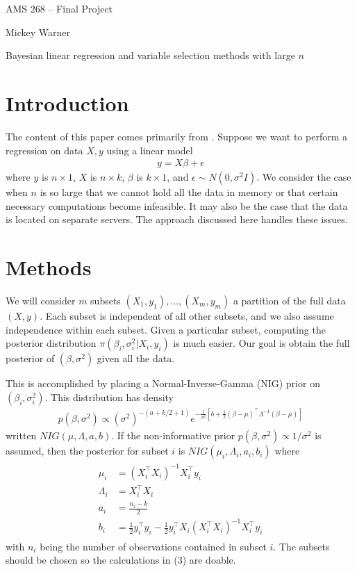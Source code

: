 \documentclass[12pt]{article}
\begin{document}
\noindent AMS 268 -- Final Project

\noindent Mickey Warner
\bigskip
\bigskip

{\Large \noindent Bayesian linear regression and variable selection methods with large $n$}


\section{Introduction}

The content of this paper comes primarily from \cite{qian2017big}. Suppose we want to perform a regression on data $X,y$ using a linear model
\begin{align}
y = X \beta + \epsilon
\end{align}
where $y$ is $n\times 1$, $X$ is $n\times k$, $\beta$ is $k\times 1$, and $\epsilon\sim N(0, \sigma^2 I)$. We consider the case when $n$ is so large that we cannot hold all the data in memory or that certain necessary computations become infeasible. It may also be the case that the data is located on separate servers. The approach discussed here handles these issues.

\section{Methods}

We will consider $m$ subsets $(X_1,y_1),\ldots,(X_m,y_m)$ a partition of the full data $(X,y)$. Each subset is independent of all other subsets, and we also assume independence within each subset. Given a particular subset, computing the posterior distribution $\pi(\beta_i,\sigma_i^2|X_i, y_i)$ is much easier. Our goal is obtain the full posterior of $(\beta,\sigma^2)$ given all the data.

This is accomplished by placing a Normal-Inverse-Gamma (NIG) prior on $(\beta_i,\sigma_i^2)$. This distribution has density
\begin{align}
p(\beta, \sigma^2) \propto (\sigma^2)^{-(a+k/2+1)}e^{-\frac{1}{\sigma^2}\left[b+\frac{1}{2}(\beta-\mu)^\top \Lambda^{-1}(\beta-\mu)\right]}
\end{align}
written $NIG(\mu,\Lambda,a,b)$. If the non-informative prior $p(\beta,\sigma^2)\propto 1/\sigma^2$ is assumed, then the posterior for subset $i$ is $NIG(\mu_i,\Lambda_i,a_i,b_i)$ where
\begin{align}
\begin{split}
\mu_i &= (X_i^\top X_i)^{-1} X_i^\top y_i \\
\Lambda_i &= X_i^\top X_i \\
a_i &= \frac{n_i-k}{2} \\
b_i &= \frac{1}{2}y_i^\top y_i -\frac{1}{2}y_i^\top X_i (X_i^\top X_i)^{-1} X_i^\top y_i
\end{split}
\end{align}
with $n_i$ being the number of observations contained in subset $i$. The subsets should be chosen so the calculations in (3) are doable.
\end{document}
